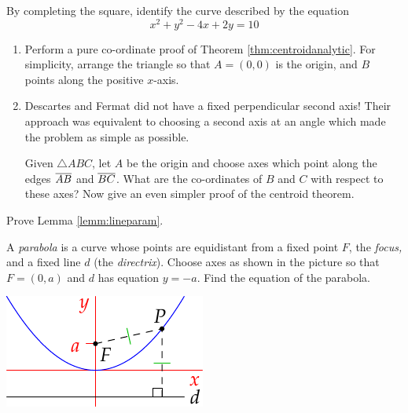\begin{exercises}
	\exstart By completing the square, identify the curve described by the equation
	\[
		x^2+y^2-4x+2y=10
	\]
	
	\begin{enumerate}\setcounter{enumi}{1}
	  \item\begin{enumerate}
	  	\item Perform a pure co-ordinate proof of Theorem \ref{thm:centroidanalytic}. For simplicity, arrange the triangle so that $A=(0,0)$ is the origin, and $B$ points along the positive $x$-axis.
	  
			\item Descartes and Fermat did not have a fixed perpendicular second axis! Their approach was equivalent to choosing a second axis at an angle which made the problem as simple as possible.\par
			Given $\triangle ABC$, let $A$ be the origin and choose axes which point along the edges $\overline{AB}$ and $\overline{BC}$. What are the co-ordinates of $B$ and $C$ with respect to these axes? Now give an even simpler proof of the centroid theorem.
	  \end{enumerate}

	
		\item Prove Lemma \ref{lemm:lineparam}.
	
	
		\begin{minipage}[t]{0.7\linewidth}\vspace{-2pt}
			\item A \emph{parabola} is a curve whose points are equidistant from a fixed point $F$, the \emph{focus,} and a fixed line $d$ (the \emph{directrix}). Choose axes as shown in the picture so that $F=(0,a)$ and $d$ has equation $y=-a$. Find the equation of the parabola.
		\end{minipage}
		\hfill
		\begin{minipage}[t]{0.29\linewidth}\vspace{-2pt}
			\flushright\includegraphics{analytic-parabola}
		\end{minipage}
	
	\end{enumerate}
\end{exercises}


